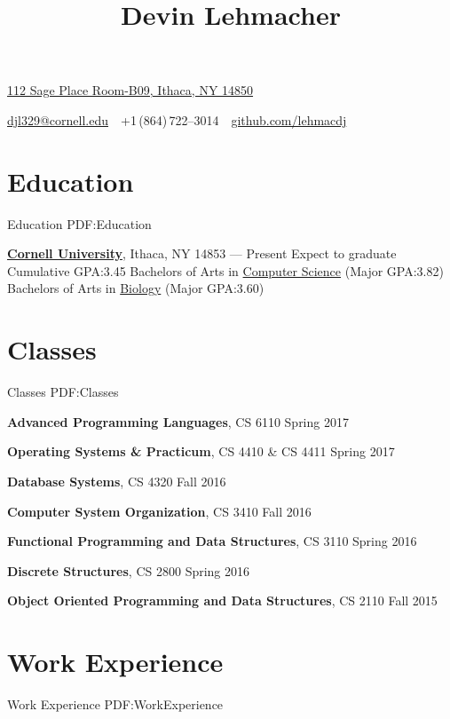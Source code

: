 \documentclass[letterpaper,10pt,oneside]{simpleresume}
\newcommand{\CVAuthor}{Devin Lehmacher}
\newcommand{\CVWebpage}{github.com/lehmacdj}
\begin{document}
\begin{minipage}[t][0pt]{\linewidth}
\pagestyle{empty}

\title{\CVAuthor}

\begin{subtitle}
\href{https://www.google.com/maps/place/112+Sage+Pl+Room-B09,+Ithaca,+NY+14850}
{112 Sage Place Room-B09, Ithaca, NY 14850}
\par
\href{mailto:djl329@cornell.edu}
{djl329@cornell.edu}
\,\SubBulletSymbol\,
+1\,(864)\,722--3014
\,\SubBulletSymbol\,
\href{https://\CVWebpage}
{\CVWebpage}
\end{subtitle}

\begin{body}

\section%
{Education}
{Education}
{PDF:Education}

\href{https://www.cornell.edu}
{\textbf{Cornell University}},
Ithaca, NY 14853
\hfill
{} --- Present
\BulletItem%
Expect to graduate 
\BulletItem%
Cumulative GPA:\@ 3.45
\BulletItem%
Bachelors of Arts in
\href{https://www.cs.cornell.edu}{Computer Science}
(Major GPA:\@ 3.82)
\BulletItem%
Bachelors of Arts in
\href{https://www.biology.cornell.edu}{Biology}
(Major GPA:\@ 3.60)

\section%
{Classes}
{Classes}
{PDF:Classes}

\textbf{Advanced Programming Languages}, CS 6110
\hfill Spring 2017

\textbf{Operating Systems \& Practicum}, CS 4410 \& CS 4411
\hfill Spring 2017

\textbf{Database Systems}, CS 4320
\hfill Fall 2016

\textbf{Computer System Organization}, CS 3410
\hfill Fall 2016

\textbf{Functional Programming and Data Structures}, CS 3110
\hfill Spring 2016

\textbf{Discrete Structures}, CS 2800
\hfill Spring 2016

\textbf{Object Oriented Programming and Data Structures}, CS 2110
\hfill Fall 2015

\section%
{Work Experience}
{Work Experience}
{PDF:WorkExperience}


\end{body}
\end{minipage}
\end{document}
